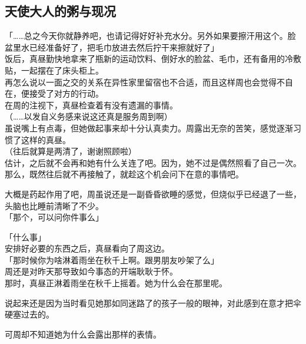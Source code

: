 \subsection{天使大人的粥与现况}

「……总之今天你就静养吧，也请记得好好补充水分。另外如果要擦汗用这个。脸盆里水已经准备好了，把毛巾放进去然后拧干来擦就好了」\\

饭后，真昼勤快地拿来了瓶新的运动饮料、倒好水的脸盆、毛巾，还有备用的冷敷贴，一起摆在了床头柜上。\\

再怎么说以一面之交的关系在异性家里留宿也不合适，而且这样周也会觉得不自在，便接受了对方的行动。\\

在周的注视下，真昼检查着有没有遗漏的事情。\\

（……以发自义务感来说这还真是服务周到啊）\\

虽说嘴上有点毒，但她做起事来却十分认真卖力。周露出无奈的苦笑，感觉逐渐习惯了这样的真昼。\\

（往后就算是两清了，谢谢照顾啦）\\

估计，之后就不会再和她有什么关连了吧。因为，她不过是偶然照看了自己一次。\\

那么，既然往后就不再接触了，就趁这个机会问下在意的事情吧。

大概是药起作用了吧，周虽说还是一副昏昏欲睡的感觉，但烧似乎已经退了一些，头脑也比睡前清晰了不少。\\

「那个，可以问你件事么」

「什么事」\\

安排好必要的东西之后，真昼看向了周这边。\\

「那时候你为啥淋着雨坐在秋千上啊。跟男朋友吵架了么」\\

周还是对昨天那导致如今事态的开端耿耿于怀。\\

那时，真昼正淋着雨坐在秋千上摇着。她为什么会在那里呢。

说起来还是因为当时看见她那如同迷路了的孩子一般的眼神，对此感到在意才把伞硬塞过去的。

可周却不知道她为什么会露出那样的表情。\\

